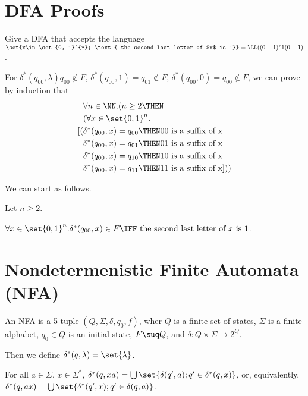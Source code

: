 \documentclass[11pt]{scrartcl}
\begin{document}
\section{DFA Proofs}

\begin{problem*}
  Give a DFA that accepts the language
  $\set{x\in\set{0, 1}^{*}; \text{ the second last letter of $x$ is
      1}} = \LL((0+1)^{*}1(0+1)$.
\end{problem*}

\begin{soln}
  \hfill

  For $\delta^{*}(q_{00}, \lambda) q_{00}\not\in F$,
  $\delta^{*}(q_{00}, 1) = q_{01}\not\in F$,
  $\delta^{*}(q_{00}, 0) = q_{00}\not\in F$, we can prove by induction
  that
  \begin{align}
&\forall n\in\NN.(n\geq 2 \THEN \\
&(\forall x\in \set{0, 1}^n.\\
    [(
& \delta^{*}(q_{00}, x) = q_{00}\THEN 00 \text{ is a suffix of x}\\
& \delta^{*}(q_{00}, x) = q_{01}\THEN 01 \text{ is a suffix of x}\\
& \delta^{*}(q_{00}, x) = q_{10}\THEN 10 \text{ is a suffix of x}\\
& \delta^{*}(q_{00}, x) = q_{11}\THEN 11 \text{ is a suffix of x}
]))
  \end{align}

We can start as follows.

Let $n \geq 2$.

$\forall x\in \set{0, 1}^n. \delta^{*}(q_{00}, x)\in F \IFF \text{ the second last letter of $x$ is 1}$. 


\end{soln}

\section{Nondetermenistic Finite Automata (NFA)}

An NFA is a 5-tuple $(Q, \Sigma, \delta, q_0, f)$, wher $Q$ is a finite set of states, $\Sigma$ is a finite alphabet, $q_0\in Q$ is an initial state, $F\suq Q$, and $\delta: Q\times \Sigma \to 2^{Q}$.

Then we define $\delta^{*}(q, \lambda) = \set{\lambda}$. 

For all $a\in \Sigma$, $x\in \Sigma^{*}$, $\delta^{*}(q, xa) = \bigcup \set{\delta(q', a); q'\in \delta^{*}(q, x)}$, or, equivalently, $\delta^{*}(q, ax) = \bigcup \set{\delta^{*}(q', x);q'\in \delta(q, a)}$.
\end{document}
